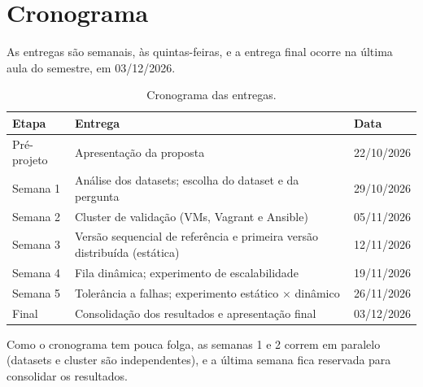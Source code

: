 \section{Cronograma}

As entregas são semanais, às quintas-feiras, e a entrega final ocorre na
última aula do semestre, em 03/12/2026.

\begin{table}[H]
  \centering
  \small
  \begin{tabularx}{\textwidth}{lXl}
    \toprule
    \textbf{Etapa} & \textbf{Entrega} & \textbf{Data} \\
    \midrule
    Pré-projeto & Apresentação da proposta & 22/10/2026 \\
    Semana 1 & Análise dos datasets; escolha do dataset e da pergunta &
      29/10/2026 \\
    Semana 2 & Cluster de validação (VMs, Vagrant e Ansible) & 05/11/2026 \\
    Semana 3 & Versão sequencial de referência e primeira versão
      distribuída (estática) & 12/11/2026 \\
    Semana 4 & Fila dinâmica; experimento de escalabilidade & 19/11/2026 \\
    Semana 5 & Tolerância a falhas; experimento estático $\times$ dinâmico &
      26/11/2026 \\
    Final & Consolidação dos resultados e apresentação final & 03/12/2026 \\
    \bottomrule
  \end{tabularx}
  \caption{Cronograma das entregas.}
\end{table}

Como o cronograma tem pouca folga, as semanas 1 e 2 correm em paralelo
(datasets e cluster são independentes), e a última semana fica reservada
para consolidar os resultados.
